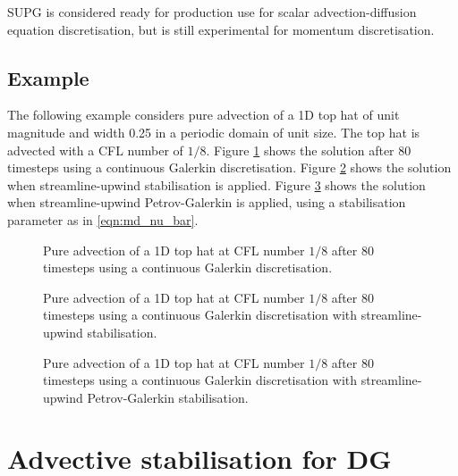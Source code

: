 SUPG is considered ready for production use for scalar advection-diffusion
equation discretisation, but is still experimental for momentum discretisation.

\subsection{Example}

The following example considers pure advection of a 1D top hat of unit magnitude
and width 0.25 in a periodic domain of unit size. The top hat is advected with a
CFL number of $1 / 8$. Figure \ref{fig:top_hat_cg} shows the solution after
80 timesteps using a continuous Galerkin discretisation. Figure \ref{fig:top_hat_su}
shows the solution when streamline-upwind stabilisation is applied.
Figure \ref{fig:top_hat_supg} shows the solution when streamline-upwind
Petrov-Galerkin is applied, using a stabilisation parameter as in \eqref{eqn:md_nu_bar}.

\begin{figure}[ht]
  \centering
  \caption{Pure advection of a 1D top hat at CFL number $1 / 8$ after 80 timesteps
           using a continuous Galerkin discretisation.}
  \label{fig:top_hat_cg}
\end{figure}

\begin{figure}[ht]
  \centering
  \caption{Pure advection of a 1D top hat at CFL number $1 / 8$ after 80 timesteps
           using a continuous Galerkin discretisation with streamline-upwind
           stabilisation.}
  \label{fig:top_hat_su}
\end{figure}

\begin{figure}[ht]
  \centering
  \caption{Pure advection of a 1D top hat at CFL number $1 / 8$ after 80 timesteps
           using a continuous Galerkin discretisation with streamline-upwind
           Petrov-Galerkin stabilisation.}
  \label{fig:top_hat_supg}
\end{figure}

\section{Advective stabilisation for DG}


